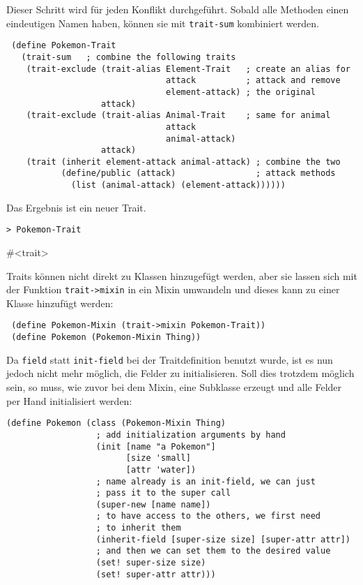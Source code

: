 Dieser Schritt wird für jeden Konflikt durchgeführt. Sobald alle Methoden einen eindeutigen Namen haben, können sie mit \texttt{trait-sum} kombiniert werden.

\begin{lstlisting}
 (define Pokemon-Trait
   (trait-sum   ; combine the following traits
    (trait-exclude (trait-alias Element-Trait   ; create an alias for
                                attack          ; attack and remove
                                element-attack) ; the original
                   attack)
    (trait-exclude (trait-alias Animal-Trait    ; same for animal
                                attack         
                                animal-attack)
                   attack)
    (trait (inherit element-attack animal-attack) ; combine the two
           (define/public (attack)                ; attack methods
             (list (animal-attack) (element-attack))))))
\end{lstlisting}

Das Ergebnis ist ein neuer Trait. 

\begin{lstlisting}
> Pokemon-Trait
\end{lstlisting}
{\routput \#<trait>}

Traits können nicht direkt zu Klassen hinzugefügt werden, aber sie lassen sich mit der Funktion \texttt{trait->mixin} in ein Mixin umwandeln und dieses kann zu einer Klasse hinzufügt werden:

\begin{lstlisting}
 (define Pokemon-Mixin (trait->mixin Pokemon-Trait))
 (define Pokemon (Pokemon-Mixin Thing))
\end{lstlisting}

Da \texttt{field} statt \texttt{init-field} bei der Traitdefinition benutzt wurde, ist es nun jedoch nicht mehr möglich, die Felder zu initialisieren. Soll dies trotzdem möglich sein, so muss, wie zuvor bei dem Mixin, eine Subklasse erzeugt und alle Felder per Hand initialisiert werden:

\begin{lstlisting}
(define Pokemon (class (Pokemon-Mixin Thing)
                  ; add initialization arguments by hand
                  (init [name "a Pokemon"]
                        [size 'small]
                        [attr 'water])
                  ; name already is an init-field, we can just
                  ; pass it to the super call
                  (super-new [name name])
                  ; to have access to the others, we first need
                  ; to inherit them
                  (inherit-field [super-size size] [super-attr attr])
                  ; and then we can set them to the desired value
                  (set! super-size size)
                  (set! super-attr attr)))
\end{lstlisting}

